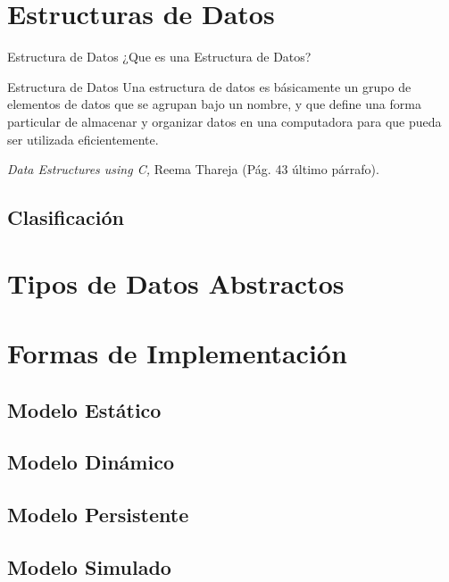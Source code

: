 \documentclass[11pt]{beamer}
\begin{document}
\section{Estructuras de Datos}

\begin{frame}{Estructura de Datos}
¿Que es una Estructura de Datos? \pause
\begin{block}{Estructura de Datos}
Una estructura de datos es básicamente un
grupo de elementos de datos que se agrupan
bajo un nombre, y que define una forma
particular de almacenar y organizar datos en
una computadora para que pueda ser utilizada
eficientemente. \\
\begin{flushright}
{\scriptsize \textit{Data Estructures using C,} Reema Thareja (Pág. 43 último párrafo).}
\end{flushright}
\end{block}
\end{frame}
\subsection{Clasificación}

\section{Tipos de Datos Abstractos}
\begin{frame}

\end{frame}
\section{Formas de Implementación}
\begin{frame}

\end{frame}

\subsection{Modelo Estático}
\begin{frame}

\end{frame}
\subsection{Modelo Dinámico}
\subsection{Modelo Persistente}
\subsection{Modelo Simulado}
\end{document}
